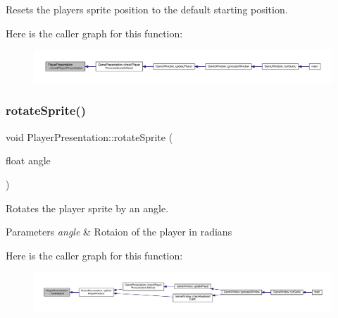 Resets the player\textquotesingle{}s sprite position to the default starting position. 

Here is the caller graph for this function\+:\nopagebreak
\begin{figure}[H]
\begin{center}
\leavevmode
\includegraphics[width=350pt]{class_player_presentation_ae4bf63751b63f582902d4ea31e06a486_icgraph}
\end{center}
\end{figure}
\mbox{\label{class_player_presentation_af938e83bf3a90263076411e0935731bd}} 
\subsubsection{\texorpdfstring{rotate\+Sprite()}{rotateSprite()}}
{\footnotesize\ttfamily void Player\+Presentation\+::rotate\+Sprite (\begin{DoxyParamCaption}\item[{float}]{angle }\end{DoxyParamCaption})}



Rotates the player sprite by an angle. 


\begin{DoxyParams}{Parameters}
{\em angle} & Rotaion of the player in radians \\
\hline
\end{DoxyParams}
Here is the caller graph for this function\+:\nopagebreak
\begin{figure}[H]
\begin{center}
\leavevmode
\includegraphics[width=350pt]{class_player_presentation_af938e83bf3a90263076411e0935731bd_icgraph}
\end{center}
\end{figure}
\mbox{\label{class_player_presentation_aef6ba74848a34fb93528062bda98059e}} 

